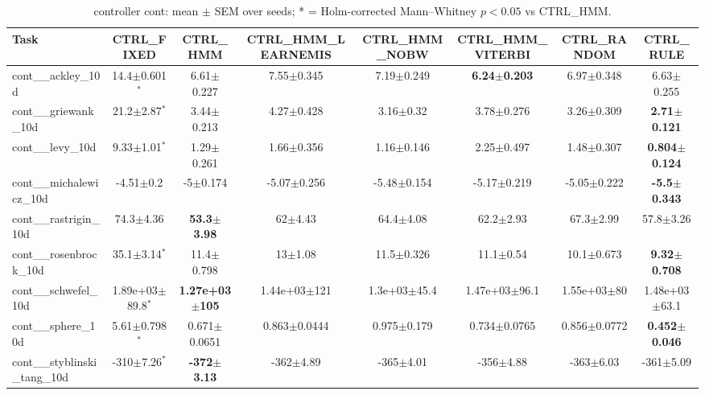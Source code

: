 \begin{table}[t]
\caption{controller cont: mean $\pm$ SEM over seeds; * = Holm-corrected Mann--Whitney $p<0.05$ vs CTRL_HMM.}
\label{tab:controller_cont}
\begin{center}\small
\begin{tabular}{lccccccc}
\hline
Task & CTRL\_FIXED & CTRL\_HMM & CTRL\_HMM\_LEARNEMIS & CTRL\_HMM\_NOBW & CTRL\_HMM\_VITERBI & CTRL\_RANDOM & CTRL\_RULE \\
\hline
cont\_\_ackley\_10d & 14.4$\pm$0.601$^{*}$ & 6.61$\pm$0.227 & 7.55$\pm$0.345 & 7.19$\pm$0.249 & \textbf{6.24$\pm$0.203} & 6.97$\pm$0.348 & 6.63$\pm$0.255 \\
cont\_\_griewank\_10d & 21.2$\pm$2.87$^{*}$ & 3.44$\pm$0.213 & 4.27$\pm$0.428 & 3.16$\pm$0.32 & 3.78$\pm$0.276 & 3.26$\pm$0.309 & \textbf{2.71$\pm$0.121} \\
cont\_\_levy\_10d & 9.33$\pm$1.01$^{*}$ & 1.29$\pm$0.261 & 1.66$\pm$0.356 & 1.16$\pm$0.146 & 2.25$\pm$0.497 & 1.48$\pm$0.307 & \textbf{0.804$\pm$0.124} \\
cont\_\_michalewicz\_10d & -4.51$\pm$0.2 & -5$\pm$0.174 & -5.07$\pm$0.256 & -5.48$\pm$0.154 & -5.17$\pm$0.219 & -5.05$\pm$0.222 & \textbf{-5.5$\pm$0.343} \\
cont\_\_rastrigin\_10d & 74.3$\pm$4.36 & \textbf{53.3$\pm$3.98} & 62$\pm$4.43 & 64.4$\pm$4.08 & 62.2$\pm$2.93 & 67.3$\pm$2.99 & 57.8$\pm$3.26 \\
cont\_\_rosenbrock\_10d & 35.1$\pm$3.14$^{*}$ & 11.4$\pm$0.798 & 13$\pm$1.08 & 11.5$\pm$0.326 & 11.1$\pm$0.54 & 10.1$\pm$0.673 & \textbf{9.32$\pm$0.708} \\
cont\_\_schwefel\_10d & 1.89e+03$\pm$89.8$^{*}$ & \textbf{1.27e+03$\pm$105} & 1.44e+03$\pm$121 & 1.3e+03$\pm$45.4 & 1.47e+03$\pm$96.1 & 1.55e+03$\pm$80 & 1.48e+03$\pm$63.1 \\
cont\_\_sphere\_10d & 5.61$\pm$0.798$^{*}$ & 0.671$\pm$0.0651 & 0.863$\pm$0.0444 & 0.975$\pm$0.179 & 0.734$\pm$0.0765 & 0.856$\pm$0.0772 & \textbf{0.452$\pm$0.046} \\
cont\_\_styblinski\_tang\_10d & -310$\pm$7.26$^{*}$ & \textbf{-372$\pm$3.13} & -362$\pm$4.89 & -365$\pm$4.01 & -356$\pm$4.88 & -363$\pm$6.03 & -361$\pm$5.09 \\
\hline
\end{tabular}
\end{center}
\end{table}